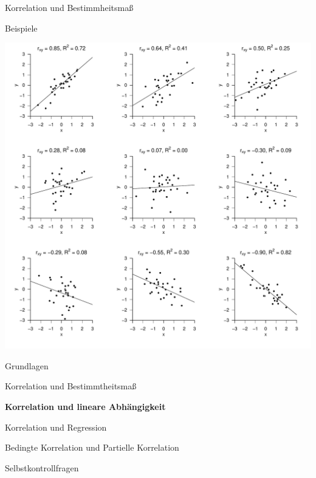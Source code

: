 \documentclass[
  8pt,
  ignorenonframetext,
]{beamer}
\begin{document}
\begin{frame}{Korrelation und Bestimmheitsmaß}
\protect\hypertarget{korrelation-und-bestimmheitsmauxdf-2}{}
\vspace{2mm}

Beispiele

\begin{center}\includegraphics[width=0.6\linewidth]{2_Abbildungen/alm_2_r2beispiele} \end{center}
\end{frame}

\begin{frame}{}
\protect\hypertarget{section-5}{}
\vfill
\large

Grundlagen

Korrelation und Bestimmtheitsmaß

\textbf{Korrelation und lineare Abhängigkeit}

Korrelation und Regression

Bedingte Korrelation und Partielle Korrelation

Selbstkontrollfragen

\vfill
\end{frame}
\end{document}
